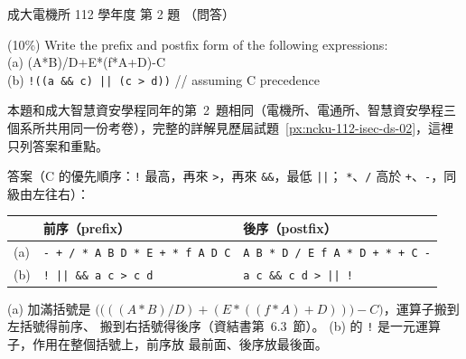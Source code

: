 \begin{pastexam}[label={px:ncku-112-ee-ds-02}]{成大電機所 112 學年度 第 2 題}
（問答）

(10\%) Write the prefix and postfix form of the following expressions:\\
(a) (A*B)/D+E*(f*A+D)-C\\
(b) \texttt{!((a \&\& c) || (c > d))} \qquad\qquad // assuming C precedence
\end{pastexam}

\begin{pastsoln}
本題和成大智慧資安學程同年的第~2~題相同（電機所、電通所、智慧資安學程三個系所共用同一份考卷），完整的詳解見歷屆試題~\ref{px:ncku-112-isec-ds-02}，這裡只列答案和重點。

答案（C 的優先順序：\texttt{!} 最高，再來 \texttt{>}，再來 \texttt{\&\&}，最低 \texttt{||}；
\texttt{*}、\texttt{/} 高於 \texttt{+}、\texttt{-}，同級由左往右）：
\begin{center}
\begin{tabular}{lll}
\toprule
 & 前序（prefix） & 後序（postfix） \\
\midrule
(a) & \texttt{- + / * A B D * E + * f A D C} & \texttt{A B * D / E f A * D + * + C -} \\
(b) & \texttt{! || \&\& a c > c d} & \texttt{a c \&\& c d > || !} \\
\bottomrule
\end{tabular}
\end{center}
(a) 加滿括號是 $\bigl(\bigl(((A*B)/D) + (E*((f*A)+D))\bigr) - C\bigr)$，運算子搬到左括號得前序、
搬到右括號得後序（資結書第~6.3~節）。 (b) 的 \texttt{!} 是一元運算子，作用在整個括號上，前序放
最前面、後序放最後面。
\end{pastsoln}
